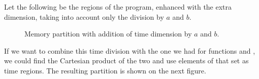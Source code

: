 \documentclass[..thesis.tex]{subfiles}
\newcommand{\opacity}{0.8}
\newcommand{\drawcube}[7]
{
      \filldraw[opacity=\opacity, #7, draw=black, dashed, xzp=#2] (#1,#3) rectangle (#4,#6);
      \filldraw[opacity=\opacity, #7, draw=black, dashed, xzp=#5] (#1,#3) rectangle (#4,#6);
      \filldraw[opacity=\opacity, #7, draw=black, dashed, xyp=#3] (#1,#2) rectangle (#4,#5);
      \filldraw[opacity=\opacity, #7, draw=black, dashed, xyp=#6] (#1,#2) rectangle (#4,#5);
      \filldraw[opacity=\opacity, #7, draw=black, dashed, yzp=#4] (#2,#3) rectangle (#5,#6);
}
\newcommand{\drawcubeoverz}[5]
{
 \drawcube{#1}{#2}{0}{#3}{#4}{\cubez}{#5}
}
\newcommand{\drawoutercube}
{
      \draw[thick,-] (0,0,0) -- ++(\cubex,0,0) -- ++(0,0,\cubez) -- node [anchor = north] {$B$} ++(-0.5*\cubex,0,0) --  node [anchor = north] {$A$} ++(-0.5*\cubex,0,0)  --   ++(0,0,-\cubez);
      \draw[thick,-] (0,\cubey,0) -- ++(\cubex,0,0) -- ++(0,0,\cubez) -- ++(-\cubex,0,0) --   ++(0,0,-\cubez)  ;

      \draw[thick,-] (0,0,0) -- (0,\cubey,0);
      \draw[thick,-] (\cubex,0,0) -- (\cubex,\cubey,0);
      \draw[thick,-] (\cubex,0,\cubez) -- ++(0,\cubey,0);
      \draw[thick,-] (0,0,\cubez) -- (0,\cubey,\cubez);
}
\newcommand{\aColor}{blue}
\newcommand{\aLColor}{\aColor!30}
\newcommand{\aRColor}{\aColor!75}
\newcommand{\bColor}{green}
\newcommand{\bLColor}{\bColor!50}
\newcommand{\bRColor}{\bColor!95}
\newcommand{\defaultColor}{red}
\newcommand{\defaultLColor}{\defaultColor!30}
\newcommand{\defaultRColor}{\defaultColor!75}
\begin{document}
Let the following be the regions of the program, enhanced with the extra dimension, taking into account only the division by $a$ and $b$.




\begin{figure}[H]
  \centering
    \caption{Memory partition with addition of time dimension by $a$ and $b$.}
\end{figure}

If we want to combine this time division with the one we had for functions  and , we could find the Cartesian product of the two and use elements of that set as time regions. The resulting partition is shown on the next figure.
\end{document}
